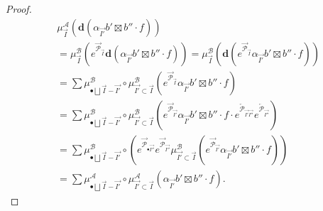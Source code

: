 \documentclass[11pt]{amsart}
\theoremstyle{definition}
\theoremstyle{remark}
\numberwithin{equation}{section}
\begin{document}
\begin{proof}
\begin{align*}
&\mu^{\mathcal{A}}_{\vec{I}}\left(\mathbf{d}(\alpha_{\vec{I'}}b'\boxtimes b''\cdot f)\right)\\
&=\mu^{\mathcal{B}}_{\vec{I}}\left(e^{\overrightarrow{\mathcal{P}}_{\overrightarrow{I}}}\mathbf{d}(\alpha_{\vec{I'}}b'\boxtimes b''\cdot f)\right)=\mu^{\mathcal{B}}_{\vec{I}}\left(\mathbf{d}(e^{\overrightarrow{\mathcal{P}}_{\overrightarrow{I}}}\alpha_{\vec{I'}}b'\boxtimes b''\cdot f)\right)\\
&=\sum \mu^{\mathcal{B}}_{\bullet\bigsqcup \vec{I}-\vec{I'}}\circ \mu^{\mathcal{B}}_{\vec{I'}\subset \vec{I}}\left(e^{\overrightarrow{\mathcal{P}}_{\overrightarrow{I}}}\alpha_{\vec{I'}}b'\boxtimes b''\cdot f\right)\\
&=\sum \mu^{\mathcal{B}}_{\bullet\bigsqcup \vec{I}-\vec{I'}}\circ \mu^{\mathcal{B}}_{\vec{I'}\subset \vec{I}}\left(e^{\overrightarrow{\mathcal{P}}_{\overrightarrow{I'}}}\alpha_{\vec{I'}}b'\boxtimes b''\cdot f\cdot e^{\overleftarrow{\mathcal{P}}_{\overrightarrow{I'}\overrightarrow{I''}}}e^{\overleftarrow{\mathcal{P}}_{\overrightarrow{I''}}}\right)\\
&=\sum \mu^{\mathcal{B}}_{\bullet\bigsqcup \vec{I}-\vec{I'}}\circ \left(e^{\overrightarrow{\mathcal{P}}_{\bullet\overrightarrow{I''}}}e^{\overrightarrow{\mathcal{P}}_{\overrightarrow{I''}}} \mu^{\mathcal{B}}_{\vec{I'}\subset \vec{I}}(e^{\overrightarrow{\mathcal{P}}_{\overrightarrow{I'}}}\alpha_{\vec{I'}}b'\boxtimes b''\cdot f)\right)\\
&=\sum \mu^{\mathcal{A}}_{\bullet\bigsqcup \vec{I}-\vec{I'}}\circ \mu^{\mathcal{A}}_{\vec{I'}\subset \vec{I}}\left(\alpha_{\vec{I'}}b'\boxtimes b''\cdot f\right).
\end{align*}


 \end{proof}
\end{document}
